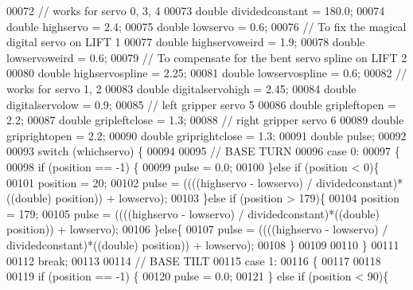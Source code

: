 \begin{DoxyCode}
00072     \textcolor{comment}{// works for servo 0, 3, 4}
00073     \textcolor{keywordtype}{double} dividedconstant = 180.0;
00074     \textcolor{keywordtype}{double} highservo = 2.4;
00075     \textcolor{keywordtype}{double} lowservo = 0.6;
00076     \textcolor{comment}{// To fix the magical digital servo on LIFT 1}
00077     \textcolor{keywordtype}{double} highservoweird = 1.9;
00078     \textcolor{keywordtype}{double} lowservoweird = 0.6;
00079     \textcolor{comment}{// To compensate for the bent servo spline on LIFT 2}
00080     \textcolor{keywordtype}{double} highservospline = 2.25;
00081     \textcolor{keywordtype}{double} lowservospline = 0.6;
00082     \textcolor{comment}{// works for servo 1, 2}
00083     \textcolor{keywordtype}{double} digitalservohigh = 2.45;
00084     \textcolor{keywordtype}{double} digitalservolow = 0.9;
00085     \textcolor{comment}{// left gripper servo 5}
00086     \textcolor{keywordtype}{double} gripleftopen = 2.2;
00087     \textcolor{keywordtype}{double} gripleftclose = 1.3;
00088     \textcolor{comment}{// right gripper servo 6}
00089     \textcolor{keywordtype}{double} griprightopen = 2.2;
00090     \textcolor{keywordtype}{double} griprightclose = 1.3;
00091     \textcolor{keywordtype}{double} pulse;
00092 
00093     \textcolor{keywordflow}{switch} (whichservo) \{
00094 
00095             \textcolor{comment}{// BASE TURN}
00096         \textcolor{keywordflow}{case} 0:
00097         \{
00098             \textcolor{keywordflow}{if} (position == -1) \{
00099                 pulse = 0.0;
00100             \}\textcolor{keywordflow}{else} \textcolor{keywordflow}{if} (position < 0)\{
00101                 position = 20;
00102                 pulse = ((((highservo - lowservo) / dividedconstant)*((double) position)) + lowservo);
00103             \}\textcolor{keywordflow}{else} \textcolor{keywordflow}{if} (position > 179)\{
00104                 position = 179;
00105                 pulse = ((((highservo - lowservo) / dividedconstant)*((double) position)) + lowservo);
00106             \}\textcolor{keywordflow}{else}\{
00107                 pulse = ((((highservo - lowservo) / dividedconstant)*((double) position)) + lowservo);
00108             \}
00109             
00110         \}
00111 
00112             \textcolor{keywordflow}{break};
00113 
00114             \textcolor{comment}{// BASE TILT}
00115         \textcolor{keywordflow}{case} 1:
00116         \{
00117             
00118             
00119             \textcolor{keywordflow}{if} (position == -1) \{
00120                 pulse = 0.0;
00121             \} \textcolor{keywordflow}{else} \textcolor{keywordflow}{if} (position < 90)\{

\end{DoxyCode}
